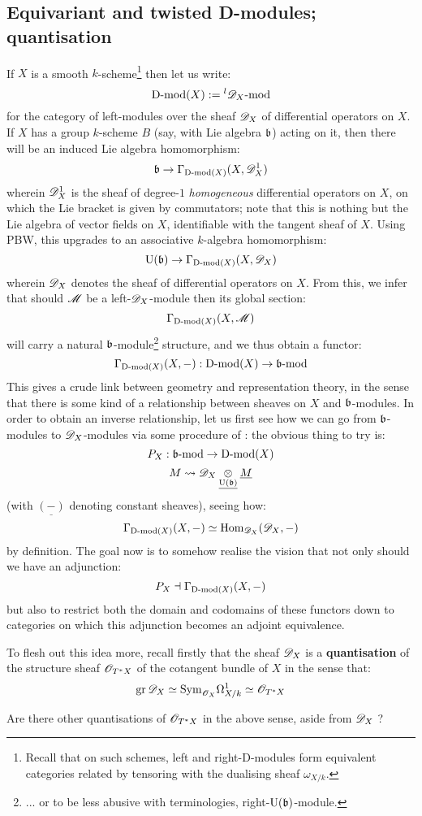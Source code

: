     \subsection{Equivariant and twisted D-modules; quantisation}
        If $X$ is a smooth $k$-scheme\footnote{Recall that on such schemes, left and right-D-modules form equivalent categories related by tensoring with the dualising sheaf $\omega_{X/k}$.} then let us write:
            $$\mathrm{D}\text{-}\mathrm{mod}(X) := {}^l\mathscr{D}_X\text{-}\mathrm{mod}$$
        for the category of left-modules over the sheaf $\mathscr{D}_X$ of differential operators on $X$. If $X$ has a group $k$-scheme $B$ (say, with Lie algebra $\mathfrak{b}$) acting on it, then there will be an induced Lie algebra homomorphism:
            $$\mathfrak{b} \to \Gamma_{\mathrm{D}\text{-}\mathrm{mod}(X)}(X, \mathscr{D}^1_X)$$
        wherein $\mathscr{D}_X^1$ is the sheaf of degree-$1$ \textit{homogeneous} differential operators on $X$, on which the Lie bracket is given by commutators; note that this is nothing but the Lie algebra of vector fields on $X$, identifiable with the tangent sheaf of $X$. Using PBW, this upgrades to an associative $k$-algebra homomorphism:
            $$\mathrm{U}(\mathfrak{b}) \to \Gamma_{\mathrm{D}\text{-}\mathrm{mod}(X)}(X, \mathscr{D}_X)$$
        wherein $\mathscr{D}_X$ denotes the sheaf of differential operators on $X$. From this, we infer that should $\mathscr{M}$ be a left-$\mathscr{D}_X$-module then its global section:
            $$\Gamma_{\mathrm{D}\text{-}\mathrm{mod}(X)}(X, \mathscr{M})$$
        will carry a natural $\mathfrak{b}$-module\footnote{... or to be less abusive with terminologies, right-$\mathrm{U}(\mathfrak{b})$-module.} structure, and we thus obtain a functor:
            $$\Gamma_{\mathrm{D}\text{-}\mathrm{mod}(X)}(X, -): \mathrm{D}\text{-}\mathrm{mod}(X) \to \mathfrak{b}\text{-}\mathrm{mod}$$
        This gives a crude link between geometry and representation theory, in the sense that there is some kind of a relationship between sheaves on $X$ and $\mathfrak{b}$-modules. In order to obtain an inverse relationship, let us first see how we can go from $\mathfrak{b}$-modules to $\mathscr{D}_X$-modules via some procedure of : the obvious thing to try is:
            $$P_X: \mathfrak{b}\text{-}\mathrm{mod} \to \mathrm{D}\text{-}\mathrm{mod}(X)$$
            $$M \mapsto \scrD_X \tensor_{\underline{\rmU(\b)}} \underline{M}$$
        (with $\underline{(-)}$ denoting constant sheaves), seeing how:
            $$\Gamma_{\mathrm{D}\text{-}\mathrm{mod}(X)}(X, -) \simeq \mathrm{Hom}_{\mathscr{D}_X}(\mathscr{D}_X, -)$$
        by definition. The goal now is to somehow realise the vision that not only should we have an adjunction:
            $$P_X \dashv \Gamma_{\mathrm{D}\text{-}\mathrm{mod}(X)}(X, -)$$
        but also to restrict both the domain and codomains of these functors down to categories on which this adjunction becomes an adjoint equivalence. 

        To flesh out this idea more, recall firstly that the sheaf $\mathscr{D}_X$ is a \textbf{quantisation} of the structure sheaf $\mathscr{O}_{T^*X}$ of the cotangent bundle of $X$ in the sense that:
            $$\operatorname{gr} \mathscr{D}_X \simeq \mathrm{Sym}_{\mathscr{O}_X} \Omega_{X/k}^1 \simeq \mathscr{O}_{T^*X}$$
        \begin{question}
            Are there other quantisations of $\mathscr{O}_{T^*X}$ in the above sense, aside from $\mathscr{D}_X$ ?
        \end{question}
            
